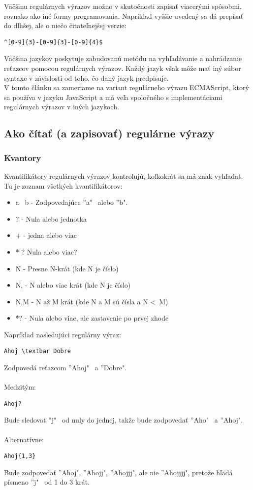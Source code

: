 \documentclass[10pt,twoside,slovak,a4paper]{article}
\begin{document}
Väčšinu regulárnych výrazov možno v skutočnosti zapísať viacerými spôsobmi, rovnako ako iné formy programovania. Napríklad vyššie uvedený sa dá prepísať do dlhšej, ale o niečo čitateľnejšej verzie:
\begin{lstlisting}[frame=single, basicstyle=\ttfamily\small, label=code:example]
	^[0-9]{3}-[0-9]{3}-[0-9]{4}$
	\end{lstlisting}

Väčšina jazykov poskytuje zabudovanú metódu na vyhľadávanie a nahrádzanie reťazcov pomocou regulárnych výrazov. Každý jazyk však môže mať iný súbor syntaxe v závislosti od toho, čo daný jazyk predpisuje.\\
V tomto článku sa zameriame na variant regulárneho výrazu ECMAScript, ktorý sa používa v jazyku JavaScript a má veľa spoločného s implementáciami regulárnych výrazov v iných jazykoch.

\subsection{Ako čítať (a zapisovať) regulárne výrazy}
\subsubsection{Kvantory}
Kvantifikátory regulárnych výrazov kontrolujú, koľkokrát sa má znak vyhľadať.\\
Tu je zoznam všetkých kvantifikátorov:\\
\begin{itemize}
	\item a \textbar \ b - Zodpovedajúce ''a" \ alebo ''b".
	\item ? - Nula alebo jednotka
	\item + - jedna alebo viac
	\item * ? Nula alebo viac?
	\item {N} - Presne N-krát (kde N je číslo)
	\item {N,} - N alebo viac krát (kde N je číslo)
	\item {N,M} - N až M krát (kde N a M sú čísla a N \textless \ M)
	\item *? - Nula alebo viac, ale zastavenie po prvej zhode
	\end{itemize}

Napríklad nasledujúci regulárny výraz:
\begin{lstlisting}[frame=single, basicstyle=\ttfamily\small, label=code:example]
	Ahoj \textbar Dobre
	\end{lstlisting}
Zodpovedá reťazcom ''Ahoj" \  a ''Dobre".\\\\
Medzitým:
\begin{lstlisting}[frame=single, basicstyle=\ttfamily\small, label=code:example]
	Ahoj?
	\end{lstlisting}
Bude sledovať ''j" \ od nuly do jednej, takže bude zodpovedať ''Aho" \ a ''Ahoj".\\\\
Alternatívne:
\begin{lstlisting}[frame=single, basicstyle=\ttfamily\small, label=code:example]
	Ahoj{1,3}
	\end{lstlisting}
Bude zodpovedať ''Ahoj", ''Ahojj", ''Ahojjj", ale nie ''Ahojjjj", pretože hľadá písmeno ''j" \ od 1 do 3 krát.
\end{document}
